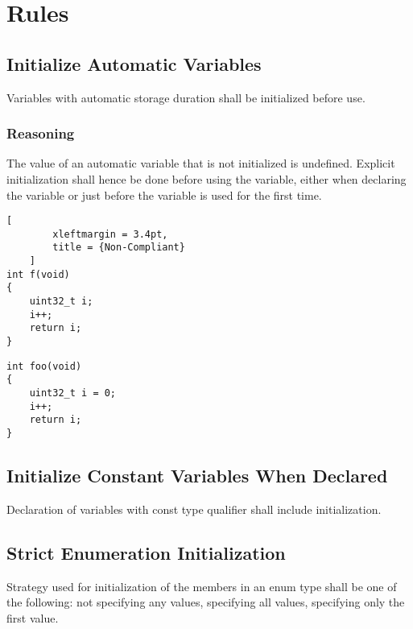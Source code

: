 \documentclass{article}
\newcounter{Rule}
\begin{document}
\section{Rules}

\subsection{Initialize Automatic Variables}

Variables with automatic storage duration shall be initialized before use.

\subsubsection{Reasoning}

The value of an automatic variable that is not initialized is undefined. Explicit initialization shall hence be done before using the variable, either when declaring the variable or just before the variable is used for the first time.

\noindent
\begin{minipage}[t]{0.47\linewidth}
	\begin{lstlisting}[
        xleftmargin = 3.4pt,
		title = {Non-Compliant}
	]
int f(void)
{
	uint32_t i;
	i++;
	return i;
}
\end{lstlisting}
\end{minipage}
\hfill
\begin{minipage}[t]{0.47\linewidth}
\begin{lstlisting}[title={Compliant}]
int foo(void)
{
	uint32_t i = 0;
	i++;
	return i;
}
\end{lstlisting}
\end{minipage}

\subsection{Initialize Constant Variables When Declared}

Declaration of variables with const type qualifier shall include initialization.

\subsection{Strict Enumeration Initialization}

Strategy used for initialization of the members in an enum type shall be one of the following: not specifying any values, specifying all values, specifying only the first value.
\end{document}

